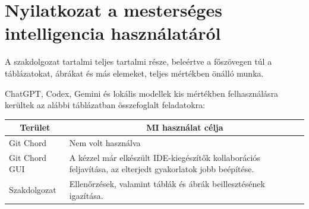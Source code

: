 \documentclass[
]{elteikthesis}[2025/03/25]
\begin{document}
{}
\lstlistoflistings
\cleardoublepage

\chapter{Nyilatkozat a mesterséges intelligencia használatáról}

A szakdolgozat tartalmi teljes tartalmi része,
beleértve a főszövegen túl a táblázatokat, ábrákat és más elemeket,
teljes mértékben önálló munka.

ChatGPT, Codex, Gemini és lokális modellek kis mértékben felhasználásra kerültek
az alábbi táblázatban összefoglalt feladatokra:

\begin{center}
\begin{tabular}{|l|l|} 
 \hline
 \multicolumn{1}{|c}{\textbf{Terület}} &
 \multicolumn{1}{|c|}{\textbf{MI használat célja}} \\
 \hline\hline

Git Chord & Nem volt használva \\
Git Chord GUI & A kézzel már elkészült IDE-kiegészítők kollaborációs feljavítása, az elterjedt gyakorlatok jobb beépítése. \\
Szakdolgozat & Ellenőrzések, valamint táblák és ábrák beillesztésének igazítása. \\

 \hline

\end{tabular}
\end{center}

\cleardoublepage
\end{document}
